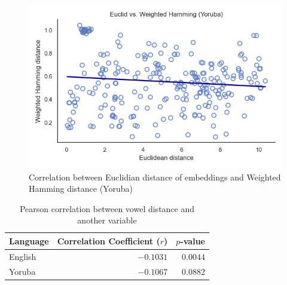 \documentclass[11pt]{article}
\begin{document}
{\begin{figure}
    \centering
    \includegraphics[width=1\linewidth]{yorcor.png}
    \caption{Correlation between Euclidian distance of embeddings and Weighted Hamming distance (Yoruba)}
    \label{fig:placeholder}
\end{figure}

\begin{table}[h]
\centering
\caption{Pearson correlation between vowel distance and another variable}
\begin{tabular}{lrr}
\toprule
\textbf{Language} & \textbf{Correlation Coefficient ($r$)} & \textbf{$p$-value} \\
\midrule
English & $-0.1031$ & $0.0044$ \\
Yoruba  & $-0.1067$ & $0.0882$ \\
\bottomrule
\end{tabular}
\end{table}



}
\end{document}
